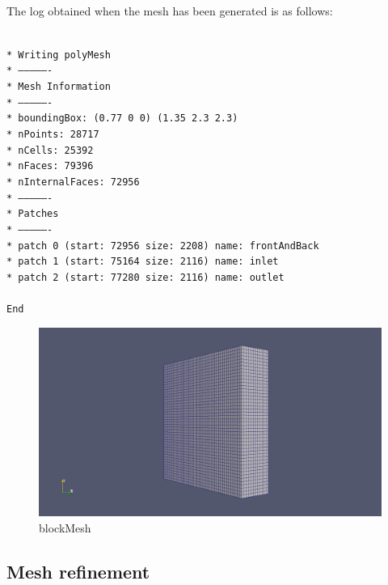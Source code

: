 \paragraph{}The log obtained when the mesh has been generated is as follows:

\texttt{\\*
Writing polyMesh\\*
----------------\\*
Mesh Information\\*
----------------\\*
  boundingBox: (0.77 0 0) (1.35 2.3 2.3)\\*
  nPoints: 28717\\*
  nCells: 25392\\*
  nFaces: 79396\\*
  nInternalFaces: 72956\\*
----------------\\*
Patches\\*
----------------\\*
  patch 0 (start: 72956 size: 2208) name: frontAndBack\\*
  patch 1 (start: 75164 size: 2116) name: inlet\\*
  patch 2 (start: 77280 size: 2116) name: outlet\\
  \\
  End
}



\begin{figure}[h!]
\includegraphics[scale=0.26]{./mesh/screenshots/blockmesh}
\centering
\caption{blockMesh}
\end{figure}

\subsection{Mesh refinement}

